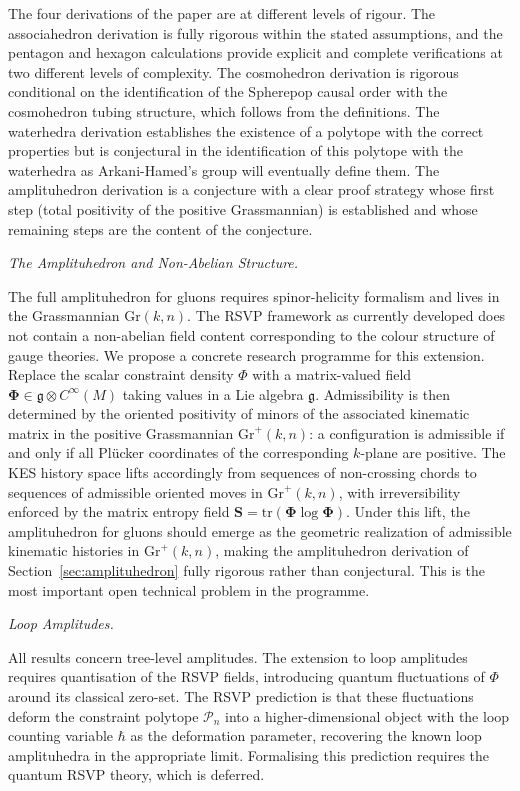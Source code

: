 \documentclass[11pt]{article}
\theoremstyle{plain}
\theoremstyle{definition}
\theoremstyle{remark}
\newcommand{\Gr}{\mathrm{Gr}}
\newcommand{\Phif}{\Phi}
\begin{document}
The four derivations of the paper are at different levels of rigour. The associahedron derivation is fully rigorous within the stated assumptions, and the pentagon and hexagon calculations provide explicit and complete verifications at two different levels of complexity. The cosmohedron derivation is rigorous conditional on the identification of the Spherepop causal order with the cosmohedron tubing structure, which follows from the definitions. The waterhedra derivation establishes the existence of a polytope with the correct properties but is conjectural in the identification of this polytope with the waterhedra as Arkani-Hamed's group will eventually define them. The amplituhedron derivation is a conjecture with a clear proof strategy whose first step (total positivity of the positive Grassmannian) is established and whose remaining steps are the content of the conjecture.

\medskip\noindent\textit{The Amplituhedron and Non-Abelian Structure.}

The full amplituhedron for gluons requires spinor-helicity formalism and lives in the Grassmannian $\Gr(k,n)$. The RSVP framework as currently developed does not contain a non-abelian field content corresponding to the colour structure of gauge theories. We propose a concrete research programme for this extension. Replace the scalar constraint density $\Phif$ with a matrix-valued field $\boldsymbol{\Phi} \in \mathfrak{g} \otimes C^\infty(M)$ taking values in a Lie algebra $\mathfrak{g}$. Admissibility is then determined by the oriented positivity of minors of the associated kinematic matrix in the positive Grassmannian $\mathrm{Gr}^+(k,n)$: a configuration is admissible if and only if all Pl\"{u}cker coordinates of the corresponding $k$-plane are positive. The KES history space lifts accordingly from sequences of non-crossing chords to sequences of admissible oriented moves in $\mathrm{Gr}^+(k,n)$, with irreversibility enforced by the matrix entropy field $\boldsymbol{S} = \mathrm{tr}(\boldsymbol{\Phi} \log \boldsymbol{\Phi})$. Under this lift, the amplituhedron for gluons should emerge as the geometric realization of admissible kinematic histories in $\mathrm{Gr}^+(k,n)$, making the amplituhedron derivation of Section~\ref{sec:amplituhedron} fully rigorous rather than conjectural. This is the most important open technical problem in the programme.

\medskip\noindent\textit{Loop Amplitudes.}

All results concern tree-level amplitudes. The extension to loop amplitudes requires quantisation of the RSVP fields, introducing quantum fluctuations of $\Phif$ around its classical zero-set. The RSVP prediction is that these fluctuations deform the constraint polytope $\mathcal{P}_n$ into a higher-dimensional object with the loop counting variable $\hbar$ as the deformation parameter, recovering the known loop amplituhedra in the appropriate limit. Formalising this prediction requires the quantum RSVP theory, which is deferred.
\end{document}
